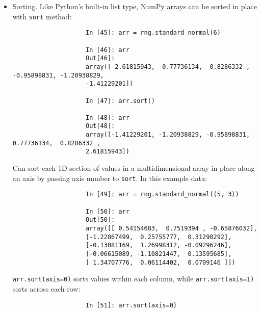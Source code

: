 \documentclass{article}
\begin{document}
\begin{enumerate}
\begin{itemize}
\begin{itemize}
\begin{itemize}
				\begin{verbatim}
					In [205]: arr = rng.standard_normal(100)
					In [206]: (arr > 0).sum() # Number of positive values
					Out[206]: 48
					In [207]: (arr <= 0).sum() # Number of non-positive values
					Out[207]: 52
				\end{verbatim}
				Parentheses here in expression {\tt (arr > 0).sum()} are necessary to be able to call {\tt sum()} on temporary result of {\tt arr > 0}.
				
				2 additional methods, \fbox{$\forall,\exists$} {\tt any, all} are useful especially for Boolean arrays. {\tt any} tests whether 1 or more values in an array is {\tt True}, while {\tt all} checks if every value is {\tt True}:
				\begin{verbatim}
					In [208]: bools = np.array([False, False, True, False])
					In [209]: bools.any()
					Out[209]: True
					In [210]: bools.all()
					Out[210]: False
				\end{verbatim}
				These methods also work with non-Boolean arrays, where nonzero elements are treated as {\tt True}.
				\item {\sf Sorting.} Like Python's built-in list type, NumPy arrays can be sorted in place with {\tt sort} method:
				\begin{verbatim}
					In [45]: arr = rng.standard_normal(6)
					
					In [46]: arr
					Out[46]: 
					array([ 2.61815943,  0.77736134,  0.8286332 , -0.95898831, -1.20938829,
					-1.41229201])
					
					In [47]: arr.sort()
					
					In [48]: arr
					Out[48]: 
					array([-1.41229201, -1.20938829, -0.95898831,  0.77736134,  0.8286332 ,
					2.61815943])
				\end{verbatim}
				Can sort each 1D section of values in a multidimensional array in place along an axis by passing axis number to {\tt sort}. In this example data:
				\begin{verbatim}
					In [49]: arr = rng.standard_normal((5, 3))
					
					In [50]: arr
					Out[50]: 
					array([[ 0.54154683,  0.7519394 , -0.65876032],
					[-1.22867499,  0.25755777,  0.31290292],
					[-0.13081169,  1.26998312, -0.09296246],
					[-0.06615089, -1.10821447,  0.13595685],
					[ 1.34707776,  0.06114402,  0.0709146 ]])
				\end{verbatim}
				{\tt arr.sort(axis=0)} sorts values within each column, while {\tt arr.sort(axis=1)} sorts across each row:
				\begin{verbatim}
					In [51]: arr.sort(axis=0)
					

\end{verbatim}
\end{itemize}
\end{itemize}
\end{itemize}
\end{enumerate}
\end{document}
